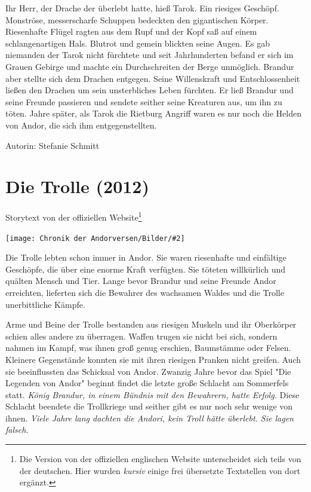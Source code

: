 \documentclass[10pt, a4paper, oneside]{book}
\newcommand{\storytext}[1]{%
    \section{#1}%
    \label{Storytext: #1}%
}
\newcommand{\bildmitts}[2][height=0.32\textwidth,width=0.48\textwidth,keepaspectratio]{%
    \begin{center}
        \texttt{[image: Chronik der Andorversen/Bilder/\#2]}
    \end{center}
}
\begin{document}
\begin{multicols}{2}
Ihr Herr, der Drache der überlebt hatte, hieß Tarok. Ein riesiges Geschöpf. Monströse, messerscharfe Schuppen bedeckten den gigantischen Körper. Riesenhafte Flügel ragten aus dem Rupf und der Kopf saß auf einem schlangenartigen Hals. Blutrot und gemein blickten seine Augen.\newpage %
Es gab niemanden der Tarok nicht fürchtete und seit Jahrhunderten befand er sich im Grauen Gebirge und machte ein Durchschreiten der Berge unmöglich. Brandur aber stellte sich dem Drachen entgegen. Seine Willenskraft und Entschlossenheit ließen den Drachen um sein unsterbliches Leben fürchten. Er ließ Brandur und seine Freunde passieren und sendete seither seine Kreaturen aus, um ihn zu töten. Jahre später, als Tarok die Rietburg Angriff waren es nur noch die Helden von Andor, die sich ihm entgegenstellten.\bigskip

Autorin: Stefanie Schmitt






\storytext{Die Trolle (2012)}

\begin{center}
    Storytext von der offiziellen Website\footnote{Die Version von der offiziellen englischen Website unterscheidet sich teils von der deutschen. Hier wurden \textit{kursiv} einige frei übersetzte Textstellen von dort ergänzt.}
\end{center}

\bildmitts{Die Trolle Bild 1.jpg}

Die Trolle lebten schon immer in Andor. Sie waren riesenhafte und einfältige Geschöpfe, die über eine enorme Kraft verfügten. Sie töteten willkürlich und quälten Mensch und Tier. Lange bevor Brandur und seine Freunde Andor erreichten, lieferten sich die Bewahrer des wachsamen Waldes und die Trolle unerbittliche Kämpfe.

Arme und Beine der Trolle bestanden aus riesigen Muskeln und ihr Oberkörper schien alles andere zu überragen. Waffen trugen sie nicht bei sich, sondern nahmen im Kampf, was ihnen groß genug erschien, Baumstämme oder Felsen. Kleinere Gegenstände konnten sie mit ihren riesigen Pranken nicht greifen. Auch sie beeinflussten das Schicksal von Andor. Zwanzig Jahre bevor das Spiel "Die Legenden von Andor" beginnt findet die letzte große Schlacht am Sommerfels statt. \textit{König Brandur, in einem Bündnis mit den Bewahrern, hatte Erfolg.} Diese Schlacht beendete die Trollkriege und seither gibt es nur noch sehr wenige von ihnen. \textit{Viele Jahre lang dachten die Andori, kein Troll hätte überlebt. Sie lagen falsch.}\bigskip


\end{multicols}
\end{document}
